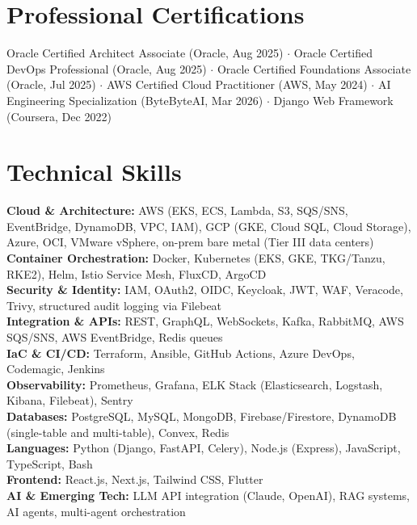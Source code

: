 \documentclass[letterpaper,11pt]{article}
\begin{document}
\section{Professional Certifications}
\vspace{-7pt}
\begin{itemize}[leftmargin=0.15in, label={}]\small{\item{
Oracle Certified Architect Associate (Oracle, Aug 2025) $\cdot$ Oracle Certified DevOps Professional (Oracle, Aug 2025) $\cdot$ Oracle Certified Foundations Associate (Oracle, Jul 2025) $\cdot$ AWS Certified Cloud Practitioner (AWS, May 2024) $\cdot$ AI Engineering Specialization (ByteByteAI, Mar 2026) $\cdot$ Django Web Framework (Coursera, Dec 2022)
}}
\end{itemize}

\section{Technical Skills}
\vspace{-7pt}
\begin{itemize}[leftmargin=0.15in, label={}]\small{\item{
\textbf{Cloud \& Architecture:} AWS (EKS, ECS, Lambda, S3, SQS/SNS, EventBridge, DynamoDB, VPC, IAM), GCP (GKE, Cloud SQL, Cloud Storage), Azure, OCI, VMware vSphere, on-prem bare metal (Tier III data centers) \\
\textbf{Container Orchestration:} Docker, Kubernetes (EKS, GKE, TKG/Tanzu, RKE2), Helm, Istio Service Mesh, FluxCD, ArgoCD \\
\textbf{Security \& Identity:} IAM, OAuth2, OIDC, Keycloak, JWT, WAF, Veracode, Trivy, structured audit logging via Filebeat \\
\textbf{Integration \& APIs:} REST, GraphQL, WebSockets, Kafka, RabbitMQ, AWS SQS/SNS, AWS EventBridge, Redis queues \\
\textbf{IaC \& CI/CD:} Terraform, Ansible, GitHub Actions, Azure DevOps, Codemagic, Jenkins \\
\textbf{Observability:} Prometheus, Grafana, ELK Stack (Elasticsearch, Logstash, Kibana, Filebeat), Sentry \\
\textbf{Databases:} PostgreSQL, MySQL, MongoDB, Firebase/Firestore, DynamoDB (single-table and multi-table), Convex, Redis \\
\textbf{Languages:} Python (Django, FastAPI, Celery), Node.js (Express), JavaScript, TypeScript, Bash \\
\textbf{Frontend:} React.js, Next.js, Tailwind CSS, Flutter \\
\textbf{AI \& Emerging Tech:} LLM API integration (Claude, OpenAI), RAG systems, AI agents, multi-agent orchestration
}}
\end{itemize}
\end{document}
